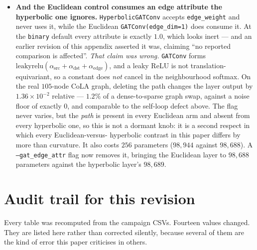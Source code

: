 \documentclass{article}
\begin{document}
\begin{itemize}
      (\texttt{remove\_self\_loops} before \texttt{add\_self\_loops};
      \texttt{test\_edge\_parity.py} verifies $105$ against $105$ on the real
      graph) and Table~\ref{tab:decomp} is measured with the fix in place.
\item \textbf{And the Euclidean control consumes an edge attribute the
      hyperbolic one ignores.} \texttt{HyperbolicGATConv} accepts
      \texttt{edge\_weight} and never uses it, while the Euclidean
      \texttt{GATConv(edge\_dim=1)} does consume it. At the
      \texttt{binary} default every attribute is exactly $1.0$, which looks
      inert --- and an earlier revision of this appendix asserted it was,
      claiming ``no reported comparison is affected''. \emph{That claim was
      wrong.} \texttt{GATConv} forms
      $\mathrm{leakyrelu}(\alpha_{\text{src}} + \alpha_{\text{dst}} +
      \alpha_{\text{edge}})$, and a leaky ReLU is not translation-equivariant,
      so a constant does \emph{not} cancel in the neighbourhood softmax. On the
      real $105$-node CoLA graph, deleting the path changes the layer output by
      $1.36\times10^{-2}$ relative --- $1.2\%$ of a dense-to-sparse graph swap,
      against a noise floor of exactly $0$, and comparable to the self-loop
      defect above. The flag never varies, but the \emph{path} is present in
      every Euclidean arm and absent from every hyperbolic one, so this is not a
      dormant knob: it is a second respect in which every Euclidean-versus-
      hyperbolic contrast in this paper differs by more than curvature. It also
      costs $256$ parameters ($98{,}944$ against $98{,}688$). A
      \texttt{--gat\_edge\_attr} flag now removes it, bringing the Euclidean
      layer to $98{,}688$ parameters against the hyperbolic layer's $98{,}689$.
\end{itemize}

\section{Audit trail for this revision}
\label{app:audit}

Every table was recomputed from the campaign CSVs. Fourteen values changed. They
are listed here rather than corrected silently, because several of them are the
kind of error this paper criticises in others.
\end{document}
